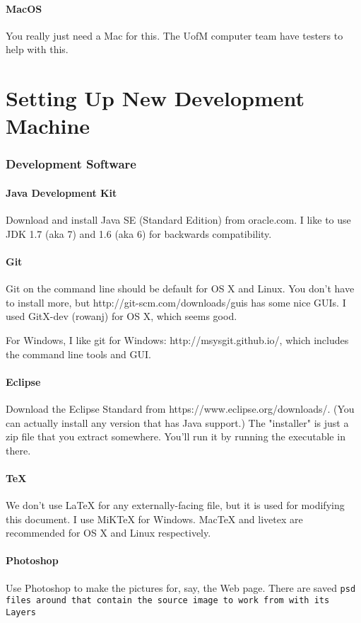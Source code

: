 \documentclass[12pt]{article}
\begin{document}
\subsection{MacOS}
You really just need a Mac for this.  The UofM computer team have testers to help with this.

\part{Setting Up New Development Machine}
\section{Development Software}
\subsection{Java Development Kit}
Download and install Java SE (Standard Edition) from oracle.com.  I like to use JDK 1.7 (aka 7) and 1.6 (aka 6) for backwards compatibility.

\subsection{Git}
Git on the command line should be default for OS X and Linux.  You don't have to install more, but http://git-scm.com/downloads/guis has some nice GUIs.  I used GitX-dev (rowanj) for OS X, which seems good.

For Windows, I like git for Windows:  http://msysgit.github.io/, which includes the command line tools and GUI.

\subsection{Eclipse}
Download the Eclipse Standard from https://www.eclipse.org/downloads/.  (You can actually install any version that has Java support.)  The "installer" is just a zip file that you extract somewhere.  You'll run it by running the executable in there.

\subsection{TeX}
We don't use LaTeX for any externally-facing file, but it is used for modifying this document.  I use MiKTeX for Windows.  MacTeX and livetex are recommended for OS X and Linux respectively.

\subsection{Photoshop}
Use Photoshop to make the pictures for, say, the Web page.  There are saved \verb .psd  files around that contain the source image to work from with its Layers.
\end{document}
